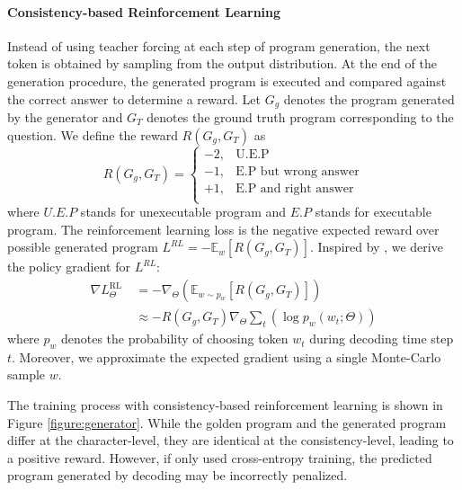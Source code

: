 \documentclass[11pt]{article}
\begin{document}
\paragraph{Consistency-based Reinforcement Learning}
\label{sec:rl}
Instead of using teacher forcing at each step of program generation, the next token is obtained by sampling from the output distribution. At the end of the generation procedure, the generated program is executed and compared against the correct answer to determine a reward. Let $G_g$ denotes the program generated by the generator and $G_T$ denotes the ground truth program corresponding to the question. We define the reward $R(G_g, G_T)$ as
\begin{equation}
R\left(G_g, G_{T}\right)=\left\{\begin{array}{ll}
-2, & \text{U.E.P} \\
-1, & \text{E.P but wrong answer} \\
+1, & \text{E.P and right answer} \\
\end{array}\right.
\label{equ:reward}
\end{equation}
where $U.E.P$ stands for unexecutable program and $E.P$ stands for executable program.
The reinforcement learning loss is the negative expected reward over possible generated program $L^{RL} = -\mathbb{E}_{w}[R(G_g, G_{T})]$. Inspired by \citet{zhong2017seq2sql}, we derive the policy gradient for $L^{RL}$:
\begin{equation}
\label{equation:rl}
\begin{aligned}
\nabla L_{\Theta}^{\text {RL }} &=-\nabla_{\Theta}\left(\mathbb{E}_{w \sim p_{w}}\left[R\left(G_g, G_{T}\right)\right]\right) \\
& \approx-R\left(G_g, G_{T}\right) \nabla_{\Theta} \sum_{t}\left(\log p_{w}\left(w_{t} ; \Theta\right)\right)
\end{aligned}
\end{equation}
where $p_{w}$ denotes the probability of choosing token $w_t$ during decoding time step $t$. Moreover, we approximate the expected gradient using a single Monte-Carlo sample $w$.

The training process with consistency-based reinforcement learning is shown in Figure \ref{figure:generator}. While the golden program and the generated program differ at the character-level, they are identical at the consistency-level, leading to a positive reward. However, if only used cross-entropy training, the predicted program generated by decoding may be incorrectly penalized.
\end{document}
